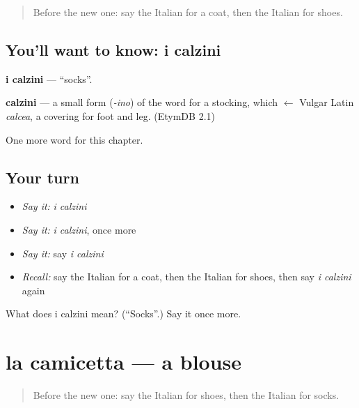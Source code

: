 \label{lesson:IT-C104-calzini}



\begin{quote}
Before the new one: say the Italian for a coat, then the Italian for shoes.
\end{quote}

\subsection*{You'll want to know: i calzini}
\textbf{i calzini} — \textquotedblleft{}socks\textquotedblright{}.

\begin{cousinweb}
\textbf{calzini} — a small form (\emph{-ino}) of the word for a stocking, which $\leftarrow$ Vulgar Latin \emph{calcea}, a covering for foot and leg. (EtymDB 2.1)
\end{cousinweb}

\begin{grammarlens}[title={What you've built}]
One more word for this chapter.
\end{grammarlens}

\subsection*{Your turn}
\begin{itemize}
\raggedright
  \item \emph{Say it:} \emph{i calzini}
  \item \emph{Say it:} \emph{i calzini}, once more
  \item \emph{Say it:} say \emph{i calzini}
  \item \emph{Recall:} say the Italian for a coat, then the Italian for shoes, then say \emph{i calzini} again
\end{itemize}

\begin{tcolorbox}[breakable,colback=teal!4,colframe=teal!35!black,title={Before you move on}]
What does i calzini mean? (\textquotedblleft{}Socks\textquotedblright{}.) Say it once more.
\end{tcolorbox}
\section[la camicetta]{la camicetta — a blouse}

\label{lesson:IT-C104-camicetta}



\begin{quote}
Before the new one: say the Italian for shoes, then the Italian for socks.
\end{quote}

